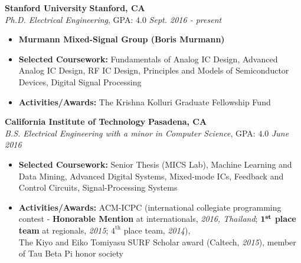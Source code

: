 \documentclass{article}
\newenvironment{changemargin}[2]{%
  \begin{list}{}{%
    \setlength{\topsep}{0pt}%
    \setlength{\leftmargin}{#1}%
    \setlength{\rightmargin}{#2}%
    \setlength{\listparindent}{\parindent}%
    \setlength{\itemindent}{\parindent}%
    \setlength{\parsep}{\parskip}%
  }%
  \item[]}{\end{list}
}
\newenvironment{body} {
	\vspace*{-16pt}
	\begin{changemargin}{-0.25in}{-0.5in}
  }	
	{\end{changemargin}
}
\begin{document}
\begin{body}
	\vspace{14pt}
	\textbf{Stanford University} \hfill \textbf{Stanford, CA} \\
	\emph{Ph.D. Electrical Engineering}, GPA: $4.0$ \hfill \emph{Sept. 2016 - present} \\
	\begin{itemize}
	\item \textbf{Murmann Mixed-Signal Group (Boris Murmann)} \\
	\item \textbf{Selected Coursework:} Fundamentals of Analog IC Design, Advanced Analog IC Design, RF IC Design, Principles and Models of Semiconductor Devices, Digital Signal Processing
	\item \textbf{Activities/Awards:} The Krishna Kolluri Graduate Fellowship Fund
	\end{itemize}

	\smallskip

	\textbf{California Institute of Technology} \hfill \textbf{Pasadena, CA} \\
	\emph{B.S. Electrical Engineering with a minor in Computer Science}, GPA: $4.0$ \hfill \emph{June 2016} \\
	\begin{itemize}
	\item \textbf{Selected Coursework:} Senior Thesis (MICS Lab), Machine Learning and Data Mining, Advanced Digital Systems, Mixed-mode ICs, Feedback and Control Circuits, Signal-Processing Systems
	\item \textbf{Activities/Awards:} ACM-ICPC (international collegiate programming contest - \textbf{Honorable Mention} at internationals, \textit{2016, Thailand}; $\boldsymbol{1}^\text{\textbf{st}}$ \textbf{place team} at regionals, \textit{2015}; $4^\text{th}$ place team, \textit{2014}),\\The Kiyo and Eiko Tomiyasu SURF Scholar award (Caltech, \textit{2015}), member of Tau Beta Pi honor society
	\end{itemize}


\end{body}
\end{document}
